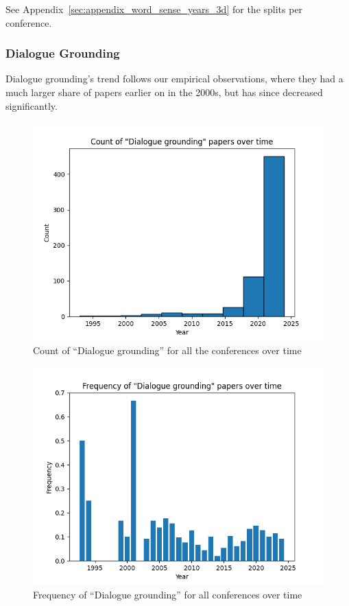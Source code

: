 \documentclass[11pt]{article}
\begin{document}
See Appendix~\ref{sec:appendix_word_sense_years_3d} for the splits per conference.

\subsubsection{Dialogue Grounding}
Dialogue grounding's trend follows our empirical observations, where they had a much larger share of papers earlier on in the 2000s, but has since decreased significantly.
\begin{figure}[h!]
  \includegraphics[width=\columnwidth]{figs/grounding_figs/Dialogue/all_confs_grounding_Dialogue.png}
  \caption{Count of ``Dialogue grounding'' for all the conferences over time}
  \label{fig:dialogue_all_confs_count}
\end{figure}

\begin{figure}[h!]
  \includegraphics[width=\columnwidth]{figs/freq_grounding_figs/Dialogue/all_confs_grounding_Dialogue.png}
  \caption{Frequency of ``Dialogue grounding'' for all conferences over time}
  \label{fig:dialogue_all_confs_freq}
\end{figure}
\end{document}
